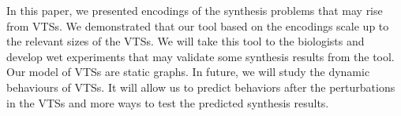 In this paper, we presented encodings of the synthesis problems
that may rise from VTSs.
%
We demonstrated that our tool based on the encodings
scale up to the relevant sizes of the VTSs. 
%
We will take this tool to the biologists and develop wet experiments 
that may validate some synthesis results from the tool.
%
Our model of VTSs are static graphs.
%
In future, we will study the dynamic behaviours of VTSs.
%
It will allow us to predict behaviors after the perturbations in the VTSs
and more ways to test the predicted synthesis results.

